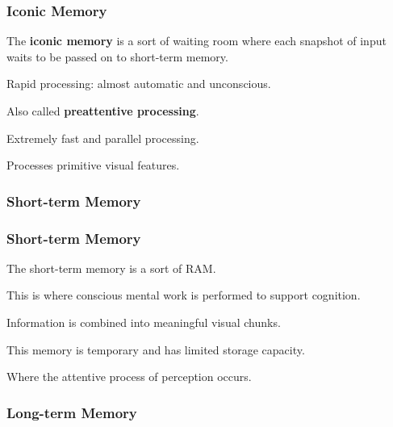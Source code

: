 \documentclass[12pt]{beamer}\usepackage[]{graphicx}\usepackage[]{color}
\begin{document}

\begin{frame}
\frametitle{Iconic Memory}

\bbi
  \item The \textbf{iconic memory} is a sort of waiting room where each snapshot of
  input waits to be passed on to short-term memory.
  \item Rapid processing: almost automatic and unconscious.
  \item Also called \textbf{preattentive processing}.
  \item Extremely fast and parallel processing.
  \item Processes primitive visual features.
\ei

\end{frame}


\begin{frame}
\frametitle{Short-term Memory}
\begin{center}
\end{center}
\end{frame}


\begin{frame}
\frametitle{Short-term Memory}

\bbi
  \item The short-term memory is a sort of RAM.
  \item This is where conscious mental work is performed to support cognition.
  \item Information is combined into meaningful visual chunks.
  \item This memory is temporary and has limited storage capacity.
  \item Where the attentive process of perception occurs.
\ei

\end{frame}


\begin{frame}
\frametitle{Long-term Memory}
\begin{center}
\end{center}
\end{frame}
\end{document}
